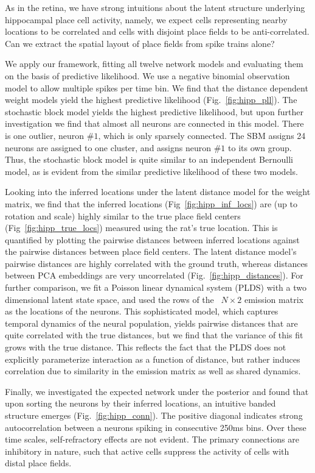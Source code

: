 As in the retina, we have strong intuitions about the latent structure
underlying hippocampal place cell activity, namely, we expect cells
representing nearby locations to be correlated and cells with disjoint
place fields to be anti-correlated. Can we extract the spatial layout
of place fields from spike trains alone?

We apply our framework, fitting all twelve network models and
evaluating them on the basis of predictive likelihood. We use a
negative binomial observation model to allow multiple spikes per time
bin. We find that the distance dependent weight models yield the
highest predictive likelihood (Fig.~\ref{fig:hipp_pll}). The
stochastic block model yields the highest predictive likelihood, but
upon further investigation we find that almost all neurons are
connected in this model. There is one outlier, neuron \#$1$, which is
only sparsely connected. The SBM assigns 24 neurons are assigned to
one cluster, and assigns neuron \#$1$ to its own group.  Thus, the
stochastic block model is quite similar to an independent Bernoulli
model, as is evident from the similar predictive likelihood of these
two models.

Looking into the inferred locations under the latent distance model
for the weight matrix, we find that the inferred locations
(Fig~\ref{fig:hipp_inf_locs}) are (up to rotation and scale) highly
similar to the true place field centers (Fig~\ref{fig:hipp_true_locs})
measured using the rat's true location. This is quantified by plotting
the pairwise distances between inferred locations against the pairwise
distances between place field centers. The latent distance model's
pairwise distances are highly correlated with the ground truth,
whereas distances between PCA embeddings are very uncorrelated
(Fig.~\ref{fig:hipp_distances}). For further comparison, we fit a
Poisson linear dynamical system (PLDS) \citep{macke2011empirical} with
a two dimensional latent state space, and used the rows of the
~$N \times 2$ emission matrix as the locations of the neurons. This
sophisticated model, which captures temporal dynamics of the neural
population, yields pairwise distances that are quite correlated with
the true distances, but we find that the variance of this fit grows
with the true distance.  This reflects the fact that the PLDS does not
explicitly parameterize interaction as a function of distance, but
rather induces correlation due to similarity in the emission matrix as
well as shared dynamics.

Finally, we investigated the expected network under the posterior and 
found that upon sorting the neurons by their inferred locations, an
intuitive banded structure emerges (Fig.~\ref{fig:hipp_conn}). 
The positive diagonal indicates strong autocorrelation between a 
neurons spiking in consecutive 250ms bins. Over these time scales, 
self-refractory effects are not evident. The primary connections 
are inhibitory in nature, such that active cells suppress the activity 
of cells with distal place fields. 

